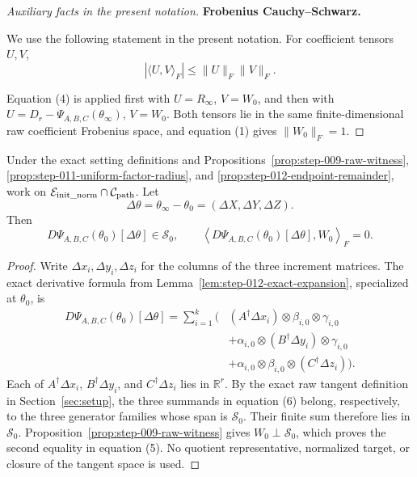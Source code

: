 \begin{proof}[Auxiliary facts in the present notation]
\medskip\noindent\textbf{Frobenius Cauchy--Schwarz.}\par

We use the following statement in the present notation. For coefficient tensors \(U,V\),
\[
  |\langle U,V\rangle_F|\le\|U\|_F\|V\|_F.
  \tag{4}
\]

Equation (4) is applied first with
\(U=R_\infty\), \(V=W_0\), and then with
\(U=D_r-\Psi_{A,B,C}(\theta_\infty)\), \(V=W_0\). Both tensors lie in the
same finite-dimensional raw coefficient Frobenius space, and equation (1)
gives \(\|W_0\|_F=1\).

\end{proof}



\begin{lemma}
\label{lem:step-013-tangent-cancellation}
Under the exact setting definitions and
Propositions~\ref{prop:step-009-raw-witness},
\ref{prop:step-011-uniform-factor-radius}, and
\ref{prop:step-012-endpoint-remainder}, work on
\(\mathcal E_{\rm init\_norm}\cap\mathcal C_{\rm path}\). Let
\[
  \Delta\theta=\theta_\infty-\theta_0
  =(\Delta X,\Delta Y,\Delta Z).
\]
Then
\[
  D\Psi_{A,B,C}(\theta_0)[\Delta\theta]\in\mathscr S_0,
  \qquad
  \left\langle D\Psi_{A,B,C}(\theta_0)[\Delta\theta],W_0\right\rangle_F=0.
  \tag{5}
\]

\end{lemma}

\begin{proof}
Write \(\Delta x_i,\Delta y_i,\Delta z_i\) for
the columns of the three increment matrices. The exact derivative formula
from Lemma~\ref{lem:step-012-exact-expansion}, specialized at
\(\theta_0\), is
\[
\begin{aligned}
  D\Psi_{A,B,C}(\theta_0)[\Delta\theta]
  =\sum_{i=1}^k\bigl(&
    (A^\dagger\Delta x_i)\otimes\beta_{i,0}\otimes\gamma_{i,0}\\
    &+\alpha_{i,0}\otimes(B^\dagger\Delta y_i)\otimes\gamma_{i,0}\\
    &+\alpha_{i,0}\otimes\beta_{i,0}\otimes(C^\dagger\Delta z_i)
  \bigr).
\end{aligned}\tag{6}
\]
Each of \(A^\dagger\Delta x_i\), \(B^\dagger\Delta y_i\), and
\(C^\dagger\Delta z_i\) lies in \(\mathbb R^r\). By the exact raw tangent
definition in Section~\ref{sec:setup}, the three summands in equation (6) belong,
respectively, to the three generator families whose span is
\(\mathscr S_0\). Their finite sum therefore lies in \(\mathscr S_0\).
Proposition~\ref{prop:step-009-raw-witness} gives
\(W_0\perp\mathscr S_0\), which proves the second equality in equation (5).
No quotient representative, normalized target, or closure of the tangent
space is used. 

\end{proof}


